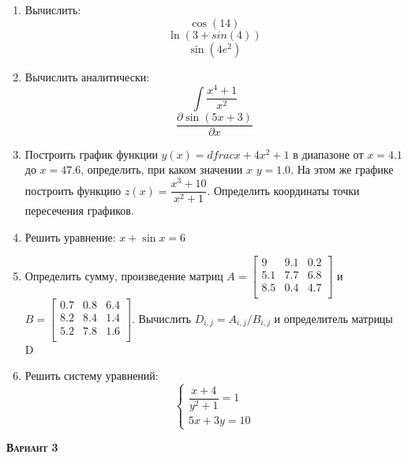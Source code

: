 \begin{enumerate}
\item Вычислить: 
\begin{equation*}\cos(14)                          \end{equation*}
\begin{equation*}\ln(3+sin(4))                     \end{equation*}
\begin{equation*}\sin(4 e^2)                       \end{equation*}

\item Вычислить аналитически: 
 \begin{equation*} \int \dfrac{x^4+1}{x^2} \end{equation*}\begin{equation*} {\dfrac{\partial \sin(5 x +3)}{\partial x}} \end{equation*}
\item Построить график функции $y(x)=dfrac{x+4}{x^2+1}$ в диапазоне от $x=4.1$ до $x=47.6$, определить, при каком значении $x$ $y=1.0$. На этом же графике построить функцию $z(x)=\dfrac{x^3+10}{x^2+1}     $. Определить координаты точки пересечения графиков. \item Решить уравнение: $x+\sin{x}=6          $

\item Определить сумму, произведение матриц $A=\begin{bmatrix}
9 &9.1 &0.2 \\
5.1 &7.7 &6.8 \\
8.5 &0.4 &4.7 \\
\end{bmatrix}
$ и $B=\begin{bmatrix}
0.7 &0.8 &6.4 \\
8.2 &8.4 &1.4 \\
5.2 &7.8 &1.6 \\
\end{bmatrix}
$. Вычислить $D_{i,j}=A_{i,j}  /  B_{i,j}$ и определитель матрицы D

\item Решить систему уравнений: \begin{equation*} \begin{cases} \dfrac{x+4}{y^2+1}=1 \\ 5x +3y=10             \end{cases} \end{equation*} 

\end{enumerate}
\textsc{\textbf{Вариант 3}}

